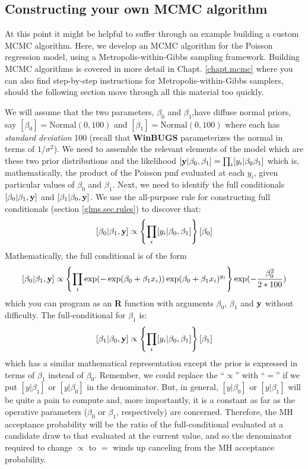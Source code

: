 
\subsection{ Constructing your own MCMC algorithm}
\label{GLMM.sect.mcmc}

At this point it might be helpful to suffer through an example
building a custom MCMC algorithm. Here, we develop an MCMC algorithm
for the Poisson regression model, using a Metropolis-within-Gibbs
sampling framework.  Building MCMC algorithms is covered in more
detail in Chapt. \ref{chapt.mcmc} where you can also find step-by-step
instructions for Metropolis-within-Gibbs samplers, should the
following section move through all this material too quickly.

We will assume that the two parameters, $\beta_0$ and $\beta_1$,have diffuse
normal priors, say $[\beta_0] = \mbox{Normal}(0,100)$ and
$[\beta_1]=\mbox{Normal}(0,100)$ where each has {\it standard deviation}
100 (recall that {\bf WinBUGS} parameterizes the normal in terms of $1/\sigma^{2}$).
We need to assemble the relevant elements of the model which are these
two prior distributions and the
likelihood $[{\bf y}|\beta_0,\beta_1] = \prod_{i} [y_i|\beta_0 \beta_1] $ which is,
mathematically, the product of the Poisson pmf evaluated at each $y_i$,
given particular values of $\beta_0$ and $\beta_1$.
Next, we need to identify the full conditionals
$[\beta_0|\beta_1, {\bf y}]$ and $[\beta_1|\beta_0,{\bf y}]$.  We use the all-purpose
rule for constructing full conditionals
(section \ref{glms.sec.rules})
 to discover that:
\[
 [\beta_0|\beta_1,{\bf y}] \propto \left\{ \prod_{i} [y_{i}|\beta_0,\beta_1]\right\}[\beta_0]
\]
Mathematically, the full conditional is of the form
\[
 [\beta_0|\beta_1,{\bf y}] \propto
\left\{ \prod_{i} 
\exp(-\exp(\beta_{0} + \beta_{1} x_{i}))
\exp(\beta_{0} + \beta_{1} x_{i})^{y_{i}}
\right\}
\exp(-\frac{\beta_{0}^2}{2*100})
\]
which you can program as an {\bf R} function with arguments
$\beta_{0}$, $\beta_{1}$ and ${\bf y}$ without difficulty.
The full-conditional for $\beta_{1}$ is:
\[
 [\beta_1|\beta_0,{\bf y}] \propto \left\{ \prod_{i}
   [y_{i}|\beta_0,\beta_1]\right\} [\beta_1]
\]
which has a similar mathematical representation except the prior is
expressed in terms of $\beta_{1}$ instead of $\beta_{0}$.
Remember, we could replace the ``$\propto$'' with ``$=$'' if we
put $[y|\beta_1]$ or $[y|\beta_0]$ in the denominator. But, in general,
$[y|\beta_0]$ or $[y|\beta_1]$ will be quite a pain to compute and, more
importantly, it is a constant as far as the operative parameters
($\beta_0$ or $\beta_1$,
respectively) are concerned. Therefore,
the MH acceptance probability will be the ratio of the
full-conditional evaluated at a candidate draw to that evaluated at the
current value, and so the denominator required to change $\propto$ to $=$
winds up canceling from the MH acceptance probability.

